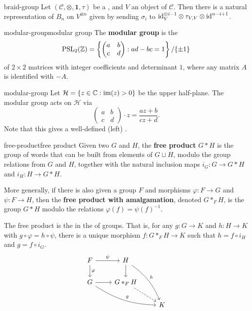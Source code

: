 \begin{example}{braid-group}
    Let $(\mathcal{C}, \otimes, \textbf{1}, \tau)$ be a , and $V$ an object of $\mathcal{C}$. Then there is a natural representation of $B_n$ on $V^{\otimes n}$ given by sending $\sigma_i$ to $\text{id}_V^{\otimes i - 1} \otimes \tau_{V, V} \otimes \text{id}^{n - i + 1}$.
\end{example}

\begin{topic}{modular-group}{modular group}
    The \textbf{modular group} is the 
    \[ \textup{PSL}_2(\mathbb{Z}) = \left\{ \begin{pmatrix} a & b \\ c & d \end{pmatrix} : ad - bc = 1 \right\} / \{ \pm 1 \} \]
    of $2 \times 2$ matrices with integer coefficients and determinant $1$, where any matrix $A$ is identified with $-A$.
\end{topic}

\begin{example}{modular-group}
    Let $\mathcal{H} = \{ z \in \mathbb{C} : \operatorname{im}(z) > 0 \}$ be the upper half-plane. The modular group acts on $\mathcal{H}$ via
    \[ \begin{pmatrix} a & b \\ c & d \end{pmatrix} \cdot z = \frac{az + b}{cz + d} . \]
    Note that this gives a well-defined (left) .
\end{example}

\begin{topic}{free-product}{free product}
    Given two  $G$ and $H$, the \textbf{free product} $G * H$ is the group of words that can be built from elements of $G \sqcup H$, modulo the group relations from $G$ and $H$, together with the natural inclusion maps $i_G : G \to G * H$ and $i_H : H \to G * H$.
    
    More generally, if there is also given a group $F$ and morphisms $\varphi : F \to G$ and $\psi : F \to H$, then the \textbf{free product with amalgamation}, denoted $G *_F H$, is the group $G * H$ modulo the relations $\varphi(f) = \psi(f)^{-1}$.
    
    The free product is the  in the  of groups. That is, for any $g : G \to K$ and $h : H \to K$ with $g \circ \varphi = h \circ \psi$, there is a unique morphism $f : G *_F H \to K$ such that $h = f \circ i_H$ and $g = f \circ i_G$.
    \[ \begin{tikzcd} F \arrow{r}{\psi} \arrow{d}{\varphi} & H \arrow{d} \arrow[bend left=15]{ddr}{h} & \\ G \arrow{r} \arrow[bend right=15]{drr}{g} & G *_F H \arrow[dashed]{dr} & \\ & & K \end{tikzcd} \]
\end{topic}

